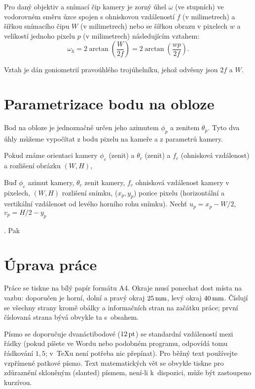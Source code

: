 \begin{lemma}\label{lemma01:1}
  Pro daný objektiv a snímací čip kamery je zorný úhel $\omega$ (ve stupních) ve vodorovném směru úzce spojen s ohniskovou vzdáleností $f$ (v milimetrech) a šířkou snímacího čipu $W$ (v milimetrech) nebo se šířkou obrazu v pixelech $w$ a velikostí jednoho pixelu $p$ (v milimetrech) následujícím vztahem:
  \begin{equation}\label{eq01:1}
    \omega_h = 2 \arctan \left(\frac{W}{2f}\right) = 2 \arctan \left(\frac{wp}{2f}\right).
  \end{equation}
\end{lemma}
\begin{dukaz}
  Vztah je dán goniometrií pravoúhlého trojúhelníku, jehož odvěsny jsou $2f$ a $W$.
\end{dukaz}

\section{Parametrizace bodu na obloze}
Bod na obloze je jednoznačně určen jeho azimutem $\phi_p$ a zenitem $\theta_p$. Tyto dva úhly můžeme vypočítat z bodu pixelu na kameře a z parametrů kamery.


Pokud známe orientaci kamery $\phi_c$ (zenit) a $\theta_c$ (zenit) a $f_c$ (ohnisková vzdálenost) a rozlišení obrázku  $(W, H)$,

\begin{lemma}\label{lemma01:2}
  Buď  $\phi_c$ azimut kamery, $\theta_c$ zenit kamery, $f_c$ ohnisková vzdálenost kamery v pixelech, $(W, H)$ rozlišení snímku, ($x_p, y_p$) pozice pixelu (horizontální a vertikální vzdálenost od levého horního rohu snímku). Nechť $u_p = x_p - W/2$, $v_p = H/2 - y_p$
\end{lemma}. Pak




\section{Úprava práce}


Práce se tiskne na bílý papír formátu A4. Okraje musí ponechat dost místa na vazbu:
doporučen je horní, dolní a pravý okraj $25\,\rm mm$, levý okraj $40\,\rm mm$.
Číslují se všechny strany kromě obálky a informačních stran na začátku práce;
první číslovaná strana bývá obvykle ta s~obsahem.

Písmo se doporučuje dvanáctibodové ($12\,\rm pt$) se standardní vzdáleností mezi řádky
(pokud píšete ve Wordu nebo podobném programu, odpovídá tomu řádkování $1,5$; v~\TeX{}u
není potřeba nic přepínat). Pro běžný text používejte vzpřímené patkové písmo.
Text matematických vět se obvykle tiskne pro zdůraznění skloněným (slanted) písmem,
není-li k~dispozici, může být zastoupeno kurzívou.

